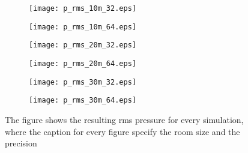 \begin{figure}[H]
\begin{subfigure}[c]{0.46\textwidth}
\texttt{[image: p\_rms\_10m\_32.eps]}
\label{fig:p_rms_10m_32}
\vspace{5mm}
\end{subfigure}
\hfill
\begin{subfigure}[c]{0.46\textwidth}
\texttt{[image: p\_rms\_10m\_64.eps]}
\label{fig:p_rms_10m_64}
\vspace{5mm}
\end{subfigure}
\begin{subfigure}[c]{0.46\textwidth}
\texttt{[image: p\_rms\_20m\_32.eps]}
\label{fig:p_rms_20m_32}
\vspace{5mm}
\end{subfigure}
\hfill
\begin{subfigure}[c]{0.46\textwidth}
\texttt{[image: p\_rms\_20m\_64.eps]}
\label{fig:p_rms_20m_64}
\vspace{5mm}
\end{subfigure}
\begin{subfigure}[c]{0.46\textwidth}
\texttt{[image: p\_rms\_30m\_32.eps]}
\label{fig:p_rms_30m_32}
\vspace{5mm}
\end{subfigure}
\hfill
\begin{subfigure}[c]{0.46\textwidth}
\texttt{[image: p\_rms\_30m\_64.eps]}
\label{fig:p_rms_30m_64}
\vspace{5mm}
\end{subfigure}
\caption{The figure shows the resulting \gls{rms} pressure for every simulation, where the caption for every figure specify the room size and the precision}
		\label{fig:p_rms}
\end{figure}


